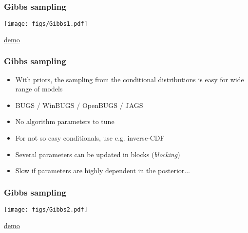 \documentclass[10pt]{beamer}
\begin{document}
\begin{frame}

\frametitle{Gibbs sampling}

    \vspace{-.5\baselineskip}
     \begin{center}
       \texttt{[image: figs/Gibbs1.pdf]}
     \end{center}
    \vspace{-.5\baselineskip}
     \begin{center}
       \href{https://github.com/MansMeg/BSDA/blob/main/lectures/L5/figs/gibbs_example.gif}{demo}
     \end{center}
\end{frame}


\begin{frame}

\frametitle{ Gibbs sampling}

  \vspace{-0.5\baselineskip}
  \begin{itemize}
  \item With  priors, the sampling from
    the conditional distributions is easy for wide range of models
  \item<2-> BUGS / WinBUGS / OpenBUGS / JAGS
  \item<3-> No algorithm parameters to tune
  \item<4-> For not so easy conditionals, use  e.g. inverse-CDF
  \item<5-> Several parameters can be updated in blocks ({\em blocking})
  \item<6-> Slow if parameters are highly dependent in the posterior...
  \end{itemize}

\end{frame}

\begin{frame}
\frametitle{Gibbs sampling}

    \vspace{-.5\baselineskip}
     \begin{center}
       \texttt{[image: figs/Gibbs2.pdf]}
     \end{center}
    \vspace{-.5\baselineskip}
     \begin{center}
       \href{https://github.com/MansMeg/BSDA/blob/main/lectures/L5/figs/gibbs_example_correlated.gif}{demo}
     \end{center}
\end{frame}
\end{document}
